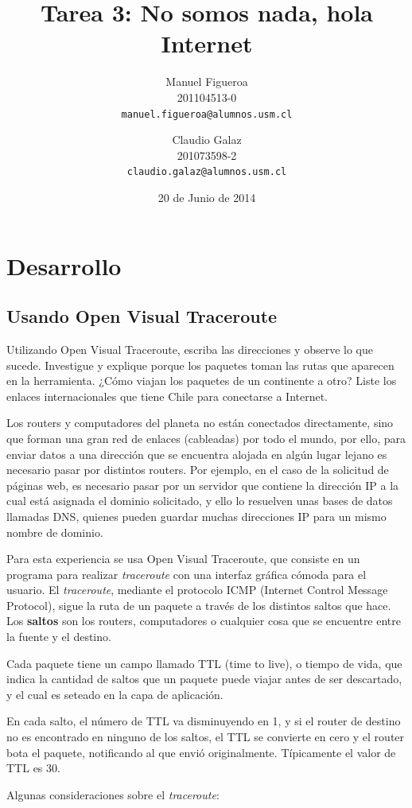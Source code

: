\documentclass{article}
\title{Tarea 3: No somos nada, hola Internet}
\author{ Manuel Figueroa\\
        201104513-0\\
  \texttt{manuel.figueroa@alumnos.usm.cl}
  \and
  Claudio Galaz\\
  201073598-2\\
  \texttt{claudio.galaz@alumnos.usm.cl}}
\date{20 de Junio de 2014}
\begin{document}
\maketitle
\pagebreak

\section{Desarrollo}
\subsection{Usando Open Visual Traceroute}
Utilizando Open Visual Traceroute, escriba las direcciones y observe lo que sucede. Investigue y explique porque los paquetes toman las rutas que aparecen en la herramienta. ¿Cómo viajan los paquetes de un continente a otro? Liste los enlaces internacionales que tiene Chile para conectarse a Internet. 


Los routers y computadores del planeta no están conectados directamente, sino que forman una gran red de enlaces (cableadas) por todo el mundo, por ello, para enviar datos a una dirección que se encuentra alojada en algún lugar lejano es necesario pasar por distintos routers. Por ejemplo, en el caso de la solicitud de páginas web, es necesario pasar por un servidor que contiene la dirección IP a la cual está asignada el dominio solicitado, y ello lo resuelven unas bases de datos llamadas DNS, quienes pueden guardar muchas direcciones IP para un mismo nombre de dominio.

Para esta experiencia se usa Open Visual Traceroute, que consiste en un programa para realizar \textit{traceroute} con una interfaz gráfica cómoda para el usuario. El \textit{traceroute}, mediante el protocolo ICMP (Internet Control Message Protocol), sigue la ruta de un paquete a través de los distintos saltos que hace. Los \textbf{saltos} son los routers, computadores o cualquier cosa que se encuentre entre la fuente y el destino. 

Cada paquete tiene un campo llamado TTL (time to live), o tiempo de vida, que indica la cantidad de saltos que un paquete puede viajar antes de ser descartado, y el cual es seteado en la capa de aplicación. 

En cada salto, el número de TTL va disminuyendo en 1, y si el router de destino no es encontrado en ninguno de los saltos, el TTL se convierte en cero y el router bota el paquete, notificando al que envió originalmente. Típicamente el valor de TTL es 30.

Algunas consideraciones sobre el \textit{traceroute}:
\end{document}
